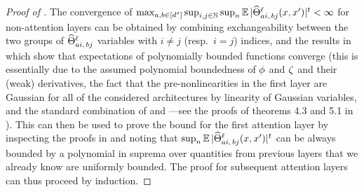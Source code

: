 \begin{proof}[Proof of ]
    The convergence of 
    $
        \max_{\substack{
            a, b \in [d^s]
        }}
        \sup_{i, j \in \mathbb{N}}
        \sup_{n}
            \operatorname*{\mathbb{E}} |
                \widehat{\Theta}_{a i , \, b j}^{\ell} ( x, x' ) 
            |^t
        <
        \infty
    $
    for non-attention layers can be obtained by combining exchangeability between the two groups of $\widehat{\Theta}_{a i , \, b j}^{\ell}$ variables with $i \neq j$ (resp.\ $i = j$) indices, and the results in \citep{yang2019v1} which show that expectations of polynomially bounded functions converge (this is essentially due to the assumed polynomial boundedness of $\phi$ and $\zeta$ and their (weak) derivatives, the fact that the pre-nonlinearities in the first layer are Gaussian for all of the considered architectures by linearity of Gaussian variables, and the standard combination of  and ---see the proofs of theorems 4.3 and 5.1 in \citep{yang2019v1}).
    This can then be used to prove the bound for the first attention layer by inspecting the proofs in  and noting that 
    $
        \sup_{n}
            \operatorname*{\mathbb{E}} |
                \widehat{\Theta}_{a i , \, b j}^{\ell} ( x, x' ) 
            |^t
    $
    can be always bounded by a polynomial in suprema over quantities from previous layers that we already know are uniformly bounded.
    The proof for subsequent attention layers can thus proceed by induction.
\end{proof}



